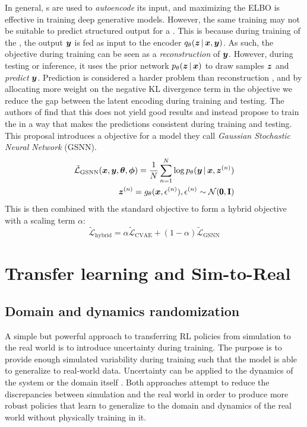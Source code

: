 In general, \vae{}s are used to \emph{autoencode} its input, and maximizing the ELBO is effective in training deep generative models. However, the same training may not be suitable to predict structured output for a \cvae{}. This is because during training of the \cvae{}, the output $\boldsymbol{y}$ is fed as input to the encoder $q_{\theta}\given{\vz}{\vx, \vy}$. As such, the objective during training can be seen as a \emph{reconstruction} of $\boldsymbol{y}$. However, during testing or inference, it uses the prior network $p_{\theta}\given{\vz}{\vx}$ to draw samples $\boldsymbol{z}$ and \emph{predict} $\boldsymbol{y}$. Prediction is considered a harder problem than reconstruction \parencite{Sohn2015}, and by allocating more weight on the negative KL divergence term in the objective we reduce the gap between the latent encoding during training and testing. The authors of \parencite{Sohn2015} find that this does not yield good results and instead propose to train the \cvae{} in a way that makes the predictions consistent during training and testing. This proposal introduces a objective for a model they call \emph{Gaussian Stochastic Neural Network} (GSNN).
\begin{equation}
\begin{split}
\tilde{\mathcal{L}}_{\text{GSNN}}(\vx, \vy, \vth, \vph) = \frac{1}{N} \sum_{n=1}^N \log p_\theta \given{\vy}{\vx, \vz^{(n)}}
\\
\vz^{(n)} = g_{\theta}(\vx, \epsilon^{(n)}), \epsilon^{(n)} \sim \mathcal{N}(\pmb{0}, \mathbf{I})
\end{split}
\end{equation}
This is then combined with the standard \cvae{} objective to form a hybrid objective with a scaling term $\alpha$:
\begin{equation}
\tilde{\mathcal{L}}_{\text{hybrid}} = \alpha \tilde{\mathcal{L}}_{\text{CVAE}} + (1 - \alpha) \tilde{\mathcal{L}}_{\text{GSNN}}
\label{eq:hybrid}
\end{equation}

\section{Transfer learning and Sim-to-Real}
\subsection{Domain and dynamics randomization}

A simple but powerful approach to transferring RL policies from simulation to the real world is to introduce uncertainty during training. The purpose is to provide enough simulated variability during training such that the model is able to generalize to real-world data. Uncertainty can be applied to the dynamics of the system \parencite{Antonova2017}\parencite{peng} or the domain itself \parencite{tobin}. Both approaches attempt to reduce the discrepancies between simulation and the real world in order to produce more robust policies that learn to generalize to the domain and dynamics of the real world without physically training in it. 

